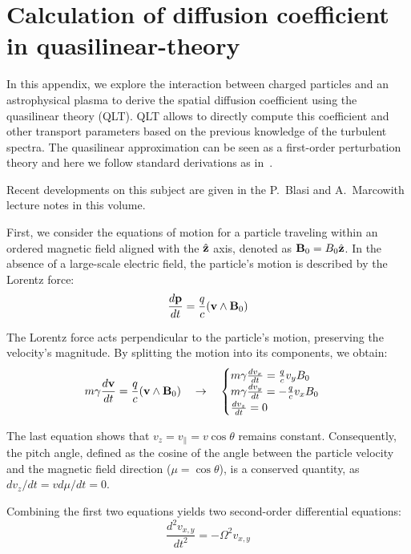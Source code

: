 \section{Calculation of diffusion coefficient in quasilinear-theory}
\label{app:diffusioncoefficient}

In this appendix, we explore the interaction between charged particles and an astrophysical plasma to derive the spatial diffusion coefficient using the quasilinear theory (QLT). 
%
QLT allows to directly compute this coefficient and other transport parameters based on the previous knowledge of the turbulent spectra.
%
The quasilinear approximation can be seen as a first-order perturbation theory and here we follow standard derivations as in~\cite{Blandford1987pr,Shalchi2009book,Blasi2013aar}.

Recent developments on this subject are given in the P.~Blasi and A.~Marcowith lecture notes in this volume.

First, we consider the equations of motion for a particle traveling within an ordered magnetic field aligned with the $\hat{\vb z}$ axis, denoted as $\vb B_0 = B_0 \hat{\vb z}$. In the absence of a large-scale electric field, the particle's motion is described by the Lorentz force:
%
\begin{equation}
\frac{d \vb p}{dt} = \frac{q}{c} (\vb v \wedge \vb B_0)
\label{eq:lorentz}
\end{equation}

The Lorentz force acts perpendicular to the particle's motion, preserving the velocity's magnitude. By splitting the motion into its components, we obtain:
%
\begin{equation}
m \gamma \frac{d \vb v}{dt} = \frac{q}{c} (\vb v \wedge \vb B_0) \quad \rightarrow \quad 
\begin{cases}
m \gamma \frac{dv_x}{dt} = \frac{q}{c} v_y B_0 \\
m \gamma \frac{dv_y}{dt} = -\frac{q}{c} v_x B_0\\
\frac{dv_z}{dt} = 0
\end{cases}
\label{eq:lorentzcomponents}
\end{equation}

The last equation shows that $v_z = v_\| = v \cos \theta$ remains constant. Consequently, the pitch angle, defined as the cosine of the angle between the particle velocity and the magnetic field direction ($\mu = \cos \theta$), is a conserved quantity, as $dv_z/dt = v d\mu/dt = 0$.

Combining the first two equations yields two second-order differential equations:
%
\begin{equation}
\frac{d^2 v_{x,y}}{dt^2} = - \Omega^2 v_{x,y}
\end{equation}

